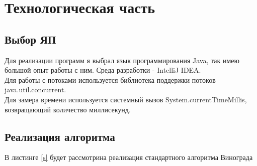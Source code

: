 \documentclass[12pt]{report}
\begin{document}
\chapter{Технологическая часть}
\section{Выбор ЯП}
Для реализации программ я выбрал язык программирования Java, так имею большой опыт работы с ним. Среда разработки - IntelliJ IDEA. \\

Для работы с потоками используется библиотека поддержки потоков java.util.concurrent. \\
Для замера времени используется системный вызов System.currentTimeMillis, возвращающий количество миллисекунд.\\


\section{Реализация алгоритма}
В листинге \ref{s} будет рассмотрина реализация стандартного алгоритма Винограда
\end{document}
